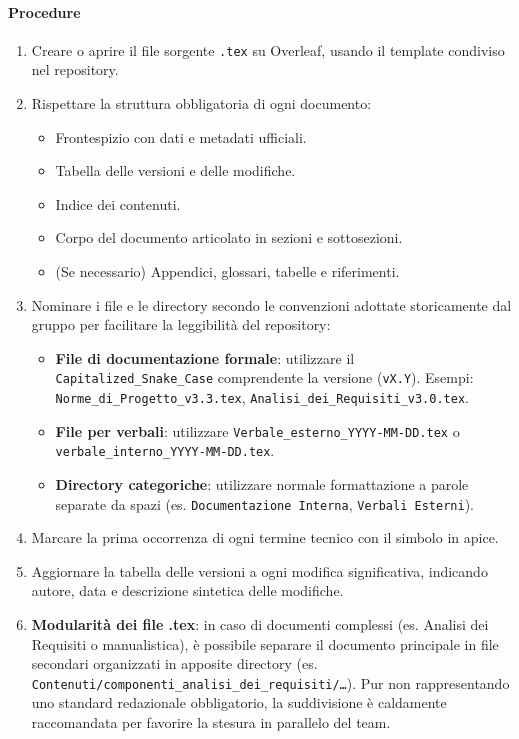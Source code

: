 \documentclass[a4paper, 11pt, oneside]{scrartcl}
\begin{document}
\paragraph{Procedure}
\begin{enumerate}
    \item Creare o aprire il file sorgente \texttt{.tex} su Overleaf{\scriptsize{}}, usando il template condiviso nel repository.
    \item Rispettare la struttura obbligatoria di ogni documento:
          \begin{itemize}
              \item Frontespizio{\scriptsize{}} con dati e metadati ufficiali.
              \item Tabella delle versioni e delle modifiche.
              \item Indice dei contenuti.
              \item Corpo del documento articolato in sezioni e sottosezioni.
              \item (Se necessario) Appendici, glossari, tabelle e riferimenti.
          \end{itemize}
    \item Nominare i file e le directory secondo le convenzioni adottate storicamente dal gruppo per facilitare la leggibilità del repository:
          \begin{itemize}
              \item \textbf{File di documentazione formale}: utilizzare il \texttt{Capitalized\_Snake\_Case} comprendente la versione (\texttt{vX.Y}). Esempi: \texttt{Norme\_di\_Progetto\_v3.3.tex}, \texttt{Analisi\_dei\_Requisiti\_v3.0.tex}.
              \item \textbf{File per verbali}: utilizzare \texttt{Verbale\_esterno\_YYYY-MM-DD.tex} o \texttt{verbale\_interno\_YYYY-MM-DD.tex}.
              \item \textbf{Directory categoriche}: utilizzare normale formattazione a parole separate da spazi (es. \texttt{Documentazione Interna}, \texttt{Verbali Esterni}).
          \end{itemize}
    \item Marcare la prima occorrenza di ogni termine tecnico con il simbolo {\scriptsize{}} in apice.
    \item Aggiornare la tabella delle versioni a ogni modifica significativa, indicando autore, data e descrizione sintetica delle modifiche.
    \item \textbf{Modularità dei file .tex}: in caso di documenti complessi (es. Analisi dei Requisiti o manualistica), è possibile separare il documento principale in file secondari organizzati in apposite directory (es. \texttt{Contenuti/componenti\_analisi\_dei\_requisiti/\dots}). Pur non rappresentando uno standard redazionale obbligatorio, la suddivisione è caldamente raccomandata per favorire la stesura in parallelo del team.
\end{enumerate}
\end{document}
